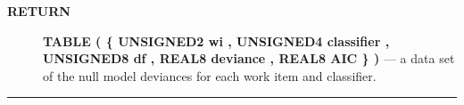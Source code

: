 \par
\begin{description}
\item [\colorbox{tagtype}{\color{white} \textbf{\textsf{RETURN}}}] \textbf{TABLE ( \{ UNSIGNED2 wi , UNSIGNED4 classifier , UNSIGNED8 df , REAL8 deviance , REAL8 AIC \} )} --- a data set of the null model deviances for each work item and classifier.
\end{description}




\rule{\linewidth}{0.5pt}
